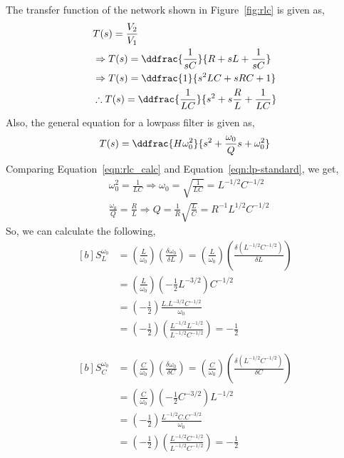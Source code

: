 The transfer function of the network shown in Figure~\ref{fig:rlc} is given as,
\begin{equation}
    \begin{aligned}[b]
       & T(s)=\frac{V_2}{V_1}\\
        &\Rightarrow T(s)=\ddfrac{\frac{1}{sC}}{R+sL+\frac{1}{sC}}\\
       & \Rightarrow T(s)=\ddfrac{1}{s^2LC+sRC+1}\\
       & \therefore T(s)=\ddfrac{\frac{1}{LC}}{s^2+s\frac{R}{L}+\frac{1}{LC}}
    \end{aligned}
    \label{eqn:rlc_calc}
\end{equation}
Also, the general equation for a lowpass filter is given as,
\begin{equation}
    T(s)=\ddfrac{H\omega_0^2}{s^2+\frac{\omega_0}{Q}s+\omega_0^2}
    \label{eqn:lp-standard}
\end{equation}
Comparing Equation~\ref{eqn:rlc_calc} and Equation~\ref{eqn:lp-standard}, we get,
\begin{equation*}
    \begin{aligned}
    &\omega_0^2=\frac{1}{LC}\Rightarrow \omega_0=\sqrt{\frac{1}{LC}}=L^{-1/2}C^{-1/2}\\
    &\frac{\omega_0}{Q}=\frac{R}{L}\Rightarrow Q=\frac{1}{R}\sqrt{\frac{L}{C}}=R^{-1}L^{1/2}C^{-1/2}
    \end{aligned}
\end{equation*}
So, we can calculate the following,
\begin{equation}
    \begin{aligned}[b]
        S_L^{\omega_0}&=\left(\frac{L}{\omega_0}\right)\left(\frac{\delta \omega_0}{\delta L}\right)=\left(\frac{L}{\omega_0}\right)\left(\frac{\delta (L^{-1/2}C^{-1/2})}{\delta L}\right)\\
        &=\left(\frac{L}{\omega_0}\right)\left(-\frac{1}{2}L^{-3/2}\right)C^{-1/2}\\
        &=\left(-\frac{1}{2}\right)\frac{L.L^{-3/2}C^{-1/2}}{\omega_0}\\
        &=\left(-\frac{1}{2}\right)\left(\frac{L^{-1/2}L^{-1/2}}{L^{-1/2}C^{-1/2}}\right)=-\frac{1}{2}
    \end{aligned}
\end{equation}

\begin{equation}
    \begin{aligned}[b]
        S_C^{\omega_0}&=\left(\frac{C}{\omega_0}\right)\left(\frac{\delta \omega_0}{\delta C}\right)=\left(\frac{C}{\omega_0}\right)\left(\frac{\delta (L^{-1/2}C^{-1/2})}{\delta C}\right)\\
        &=\left(\frac{C}{\omega_0}\right)\left(-\frac{1}{2}C^{-3/2}\right)L^{-1/2}\\
        &=\left(-\frac{1}{2}\right)\frac{L^{-1/2}C.C^{-3/2}}{\omega_0}\\
        &=\left(-\frac{1}{2}\right)\left(\frac{L^{-1/2}C^{-1/2}}{L^{-1/2}C^{-1/2}}\right)=-\frac{1}{2}
    \end{aligned}
\end{equation}

